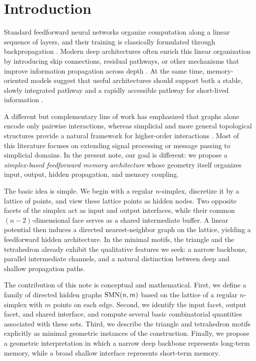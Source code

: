 \section{Introduction}
\label{sec:introduction}

Standard feedforward neural networks organize computation along a linear sequence of layers, and their training is classically formulated through backpropagation \cite{RumelhartHintonWilliams1986}. Modern deep architectures often enrich this linear organization by introducing skip connections, residual pathways, or other mechanisms that improve information propagation across depth \cite{HeZhangRenSun2016}. At the same time, memory-oriented models suggest that useful architectures should support both a stable, slowly integrated pathway and a rapidly accessible pathway for short-lived information \cite{HochreiterSchmidhuber1997,WestonChopraBordes2014,GravesWayneDanihelka2014}.

A different but complementary line of work has emphasized that graphs alone encode only pairwise interactions, whereas simplicial and more general topological structures provide a natural framework for higher-order interactions \cite{BarbarossaSardellitti2019,EbliDefferrardSpreemann2020,BodnarFrascaWangEtAl2021,HajijEtAl2022}. Most of this literature focuses on extending signal processing or message passing to simplicial domains. In the present note, our goal is different: we propose a \emph{simplex-based feedforward memory architecture} whose geometry itself organizes input, output, hidden propagation, and memory coupling.

The basic idea is simple. We begin with a regular $n$-simplex, discretize it by a lattice of points, and view these lattice points as hidden nodes. Two opposite facets of the simplex act as input and output interfaces, while their common $(n-2)$-dimensional face serves as a shared intermediate buffer. A linear potential then induces a directed nearest-neighbor graph on the lattice, yielding a feedforward hidden architecture. In the minimal motifs, the triangle and the tetrahedron already exhibit the qualitative features we seek: a narrow backbone, parallel intermediate channels, and a natural distinction between deep and shallow propagation paths.

The contribution of this note is conceptual and mathematical. First, we define a family of directed hidden graphs $\mathrm{SMN}(n,m)$ based on the lattice of a regular $n$-simplex with $m$ points on each edge. Second, we identify the input facet, output facet, and shared interface, and compute several basic combinatorial quantities associated with these sets. Third, we describe the triangle and tetrahedron motifs explicitly as minimal geometric instances of the construction. Finally, we propose a geometric interpretation in which a narrow deep backbone represents long-term memory, while a broad shallow interface represents short-term memory.
